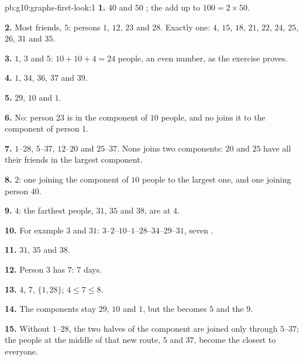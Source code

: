 \begin{solution}{pb:g10:graphs-first-look:1}
\textbf{1.} $40$  and $50$ ; the  add up to $100 = 2 \times 50$.

\textbf{2.} Most friends, $5$: persons $1$, $12$, $23$ and $28$. Exactly one: $4$, $15$, $18$, $21$, $22$, $24$,
$25$, $26$, $31$ and $35$.

\textbf{3.}  $1$, $3$ and $5$: $10 + 10 + 4 = 24$ people, an even number, as the exercise proves.

\textbf{4.} $1$, $34$, $36$, $37$ and $39$.

\textbf{5.} $29$, $10$ and $1$.

\textbf{6.} No: person $23$ is in the component of $10$ people, and no  joins it to the component of person $1$.

\textbf{7.} $1$--$28$, $5$--$37$, $12$--$20$ and $25$--$37$. None joins two components: $20$ and $25$ have all their
friends in the largest component.

\textbf{8.} $2$: one  joining the component of $10$ people to the largest one, and one joining person $40$.

\textbf{9.} $4$: the farthest people, $31$, $35$ and $38$, are at  $4$.

\textbf{10.} For example $3$ and $31$: $3$--$2$--$10$--$1$--$28$--$34$--$29$--$31$, seven .

\textbf{11.} $31$, $35$ and $38$.

\textbf{12.} Person $3$ has  $7$: $7$ days.

\textbf{13.}  $4$,  $7$,  $\{1, 28\}$; $4 \le 7 \le 8$.

\textbf{14.} The components stay $29$, $10$ and $1$, but the  becomes $5$ and the  $9$.

\textbf{15.} Without $1$--$28$, the two halves of the component are joined only through $5$--$37$; the people at
the middle of that new route, $5$ and $37$, become the closest to everyone.


\end{solution}
